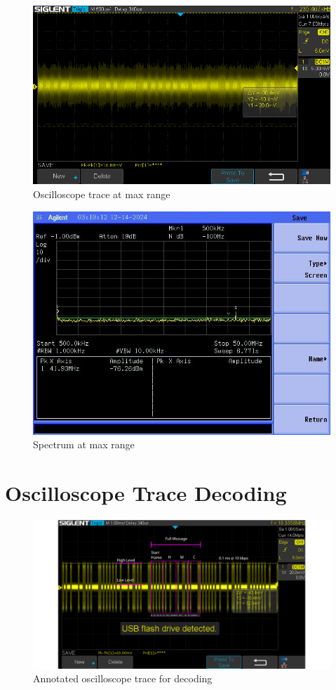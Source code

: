 \documentclass[letterpaper,12pt]{article}
\begin{document}
\begin{figure}[H]
	\begin{centering}
		\includegraphics[width=0.8\columnwidth]{figures/maxm.trace}
		\caption{Oscilloscope trace at max range}
	\end{centering}
\end{figure}

\begin{figure}[H]
	\begin{centering}
		\includegraphics[width=0.5\columnwidth]{figures/maxm.spectra}
		\caption{Spectrum at max range}
	\end{centering}
\end{figure}


\newpage
\section{Oscilloscope Trace Decoding}
\begin{figure}[H]
	\begin{centering}
		\includegraphics[width=1.1\columnwidth]{figures/decoding.pdf}
		\caption{Annotated oscilloscope trace for decoding}
	\end{centering}
\end{figure}
\end{document}
